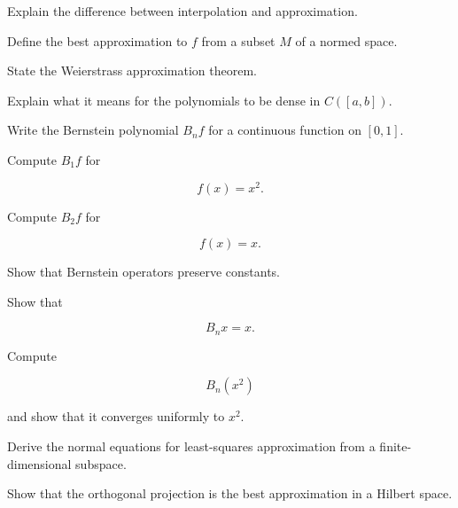 \begin{exercise}[1]
Explain the difference between interpolation and approximation.
\end{exercise}

\begin{exercise}[1]
Define the best approximation to \(f\) from a subset \(M\) of a normed
space.
\end{exercise}

\begin{exercise}[1]
State the Weierstrass approximation theorem.
\end{exercise}

\begin{exercise}[1]
Explain what it means for the polynomials to be dense in
\(C([a,b])\).
\end{exercise}

\begin{exercise}[1]
Write the Bernstein polynomial \(B_nf\) for a continuous function on
\([0,1]\).
\end{exercise}

\begin{exercise}[1]
Compute \(B_1f\) for

\[
f(x)=x^2.
\]
\end{exercise}

\begin{exercise}[1]
Compute \(B_2f\) for

\[
f(x)=x.
\]
\end{exercise}

\begin{exercise}[2]
Show that Bernstein operators preserve constants.
\end{exercise}

\begin{exercise}[2]
Show that

\[
B_nx=x.
\]
\end{exercise}

\begin{exercise}[2]
Compute

\[
B_n(x^2)
\]

and show that it converges uniformly to \(x^2\).
\end{exercise}

\begin{exercise}[2]
Derive the normal equations for least-squares approximation from a
finite-dimensional subspace.
\end{exercise}

\begin{exercise}[2]
Show that the orthogonal projection is the best approximation in a
Hilbert space.
\end{exercise}

